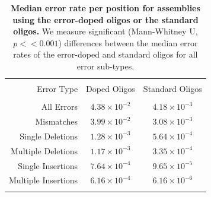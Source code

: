 \documentclass[letterpaper,12pt]{article}
\begin{document}
\clearpage
\begin{table}[!htbp] \centering
  \caption{\small \textbf{Median error rate per position for assemblies using the error-doped oligos or the standard oligos.} We measure significant (Mann-Whitney U, $p << 0.001$) differences between the median error rates of the error-doped and standard oligos for all error sub-types.}
  \label{tab:dope-std-errs}
\begin{tabular}{rcc}
\\[-1.8ex]\hline
\hline \\[-1.8ex]
Error Type & Doped Oligos & Standard Oligos \\
\hline \\[-1.8ex]
All Errors          & $4.38\times10^{-2}$ & $4.18\times10^{-3}$ \\
Mismatches          & $3.99\times10^{-2}$ & $3.08\times10^{-3}$ \\
Single Deletions    & $1.28\times10^{-3}$ & $5.64\times10^{-4}$ \\
Multiple Deletions  & $1.17\times10^{-3}$ & $3.35\times10^{-4}$ \\
Single Insertions   & $7.64\times10^{-4}$ & $9.65\times10^{-5}$ \\
Multiple Insertions & $6.16\times10^{-4}$ & $6.16\times10^{-6}$ \\
\hline \\[-1.8ex]
\end{tabular}
\end{table}
\end{document}
